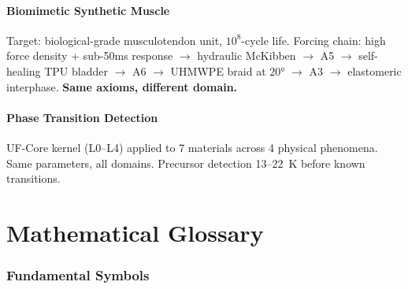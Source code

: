 \documentclass[11pt, a4paper]{article}
\begin{document}
\subsection{Biomimetic Synthetic Muscle}

Target: biological-grade musculotendon unit, $10^8$-cycle life.
Forcing chain: high force density + sub-50ms response $\to$
hydraulic McKibben $\to$ A5 $\to$ self-healing TPU bladder $\to$
A6 $\to$ UHMWPE braid at $20°$ $\to$ A3 $\to$ elastomeric
interphase. \textbf{Same axioms, different domain.}

\subsection{Phase Transition Detection}

UF-Core kernel (L0--L4) applied to 7 materials across 4 physical
phenomena. Same parameters, all domains. Precursor detection
13--22~K before known transitions.

\newpage

\part{Mathematical Glossary}

\section{Fundamental Symbols}
\end{document}
